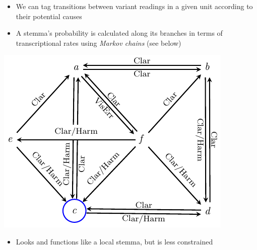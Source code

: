 \documentclass[10pt]{beamer}
\begin{document}
	\begin{frame}
		\begin{itemize}
			\item We can tag transitions between variant readings in a given unit according to their potential causes
			\item A stemma's probability is calculated along its branches in terms of transcriptional rates using \emph{Markov chains} (see below)
		\end{itemize}
		\begin{center}
			\includegraphics[scale=0.75]{../img/K5V22U6-12-transcriptional-probabilities.pdf}
		\end{center}
		\begin{itemize}
			\item Looks and functions like a local stemma, but is less constrained
		\end{itemize}
	\end{frame}
\end{document}
